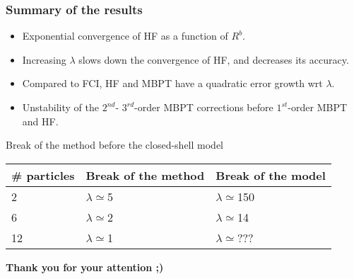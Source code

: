 \documentclass[xcolor=pdftex,hyperref={pdfpagelabels=false},table]{beamer}
\begin{document}
\begin{frame}
\frametitle{Summary of the results}
\begin{scriptsize}
\begin{itemize}
 \item Exponential convergence of HF as a function of $R^b$.
\item Increasing $\lambda$ slows down the convergence of HF, and decreases its accuracy.
\item Compared to FCI, HF and MBPT have a quadratic error growth wrt $\lambda$.
\item Unstability of the $2^{nd}$- $3^{rd}$-order MBPT corrections before $1^{st}$-order MBPT and HF.
\end{itemize}
\begin{alertblock}{Break of the method before the closed-shell model}
\begin{center}
\begin{tabular}{p{1.5cm}|p{1.5cm}|p{1.5cm}}
  \# particles & Break of the method & Break of the model  \\\hline
2 & $\lambda \simeq$5 & $\lambda \simeq$150 \\\hline
6 & $\lambda \simeq$2 & $\lambda \simeq$14 \\\hline
12 & $\lambda \simeq$1 & $\lambda \simeq$??? \\\hline
\end{tabular}
\end{center}
\end{alertblock}
\end{scriptsize}
\end{frame}


\begin{frame}
\begin{center}
\textbf{Thank you for your attention ;)}
\end{center}
\end{frame}
\end{document}
